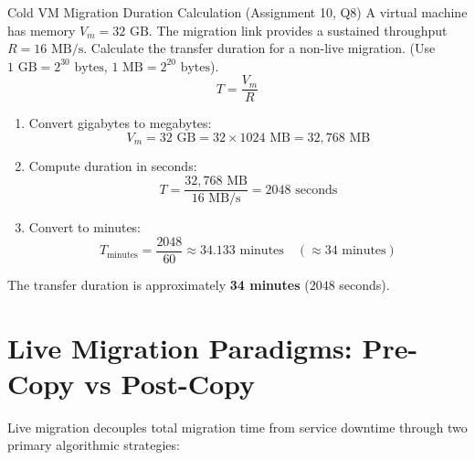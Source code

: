 \begin{solved}{Cold VM Migration Duration Calculation (Assignment 10, Q8)}
\Given A virtual machine has memory $V_m = 32\text{ GB}$. The migration link provides a sustained throughput $R = 16\text{ MB/s}$. Calculate the transfer duration for a non-live migration. (Use $1\text{ GB} = 2^{30}\text{ bytes}$, $1\text{ MB} = 2^{20}\text{ bytes}$).
\Formula
\begin{equation}
T = \frac{V_m}{R}
\end{equation}
\Steps
\begin{enumerate}[leftmargin=*]
  \item Convert gigabytes to megabytes:
  \begin{equation}
  V_m = 32\text{ GB} = 32 \times 1024\text{ MB} = 32,768\text{ MB}
  \end{equation}
  \item Compute duration in seconds:
  \begin{equation}
  T = \frac{32,768\text{ MB}}{16\text{ MB/s}} = 2048\text{ seconds}
  \end{equation}
  \item Convert to minutes:
  \begin{equation}
  T_{\text{minutes}} = \frac{2048}{60} \approx 34.133\text{ minutes} \quad (\approx 34\text{ minutes})
  \end{equation}
\end{enumerate}
\Answer The transfer duration is approximately \textbf{34 minutes} ($2048$ seconds).
\end{solved}

\section{Live Migration Paradigms: Pre-Copy vs Post-Copy}
Live migration decouples total migration time from service downtime through two primary algorithmic strategies:

